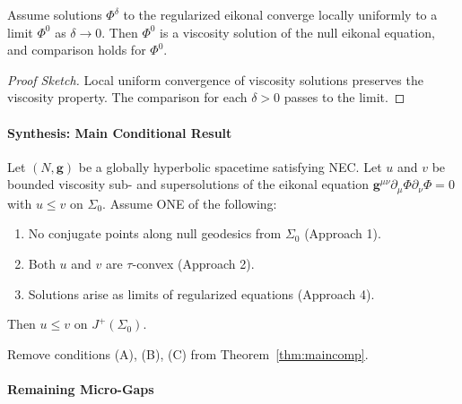 \begin{theorem}\label{thm:limitcomp}
Assume solutions $\Phi^\delta$ to the regularized eikonal converge locally uniformly to a limit $\Phi^0$ as $\delta \to 0$. Then $\Phi^0$ is a viscosity solution of the null eikonal equation, and comparison holds for $\Phi^0$.
\end{theorem}

\begin{proof}[Proof Sketch]
Local uniform convergence of viscosity solutions preserves the viscosity property. The comparison for each $\delta > 0$ passes to the limit.
\end{proof}

\paragraph{Synthesis: Main Conditional Result}

\begin{theorem}\label{thm:maincomp}
Let $(N, \mathbf{g})$ be a globally hyperbolic spacetime satisfying NEC. Let $u$ and $v$ be bounded viscosity sub- and supersolutions of the eikonal equation $\mathbf{g}^{\mu\nu}\partial_\mu\Phi\partial_\nu\Phi = 0$ with $u \leq v$ on $\Sigma_0$. Assume ONE of the following:
\begin{enumerate}
    \item[(A)] No conjugate points along null geodesics from $\Sigma_0$ (Approach 1).
    \item[(B)] Both $u$ and $v$ are $\tau$-convex (Approach 2).
    \item[(C)] Solutions arise as limits of regularized equations (Approach 4).
\end{enumerate}
Then $u \leq v$ on $J^+(\Sigma_0)$.
\end{theorem}

\begin{openproblem}\label{open:unconditional}
Remove conditions (A), (B), (C) from Theorem~\ref{thm:maincomp}.
\end{openproblem}

\paragraph{Remaining Micro-Gaps}

